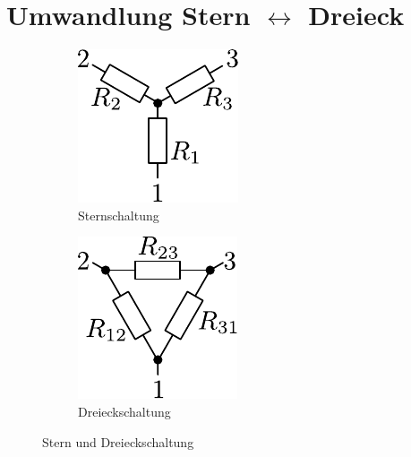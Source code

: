 



\section{Umwandlung Stern $\leftrightarrow$ Dreieck}
\begin{figure}[h!]
	\centering
	\begin{subfigure}[b]{0.4\textwidth}
		\centering
		\includegraphics[scale=\schscale]{star_sch.pdf}
		\caption{Sternschaltung}
		\label{sch:star}
	\end{subfigure}
	\begin{subfigure}[b]{0.4\textwidth}
		\centering
		\includegraphics[scale=\schscale]{tri_sch.pdf}
		\caption{Dreieckschaltung}
		\label{sch:tri}
	\end{subfigure}
	\caption{Stern und Dreieckschaltung}
	\label{sch:tristar}
\end{figure}


